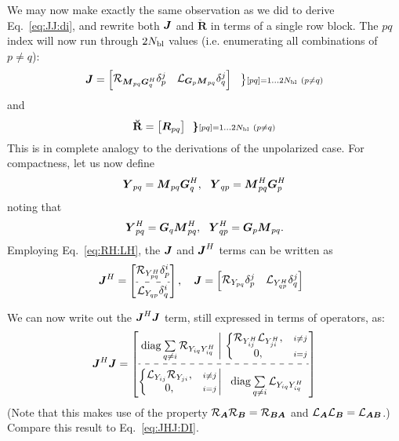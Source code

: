 \documentclass[useAMS,usenatbib]{mn2e}
\makeatletter
\newcommand{\mat}[1]{{\bmath{#1}}}
\newcommand{\JJ}{\mat{J}} %
\newcommand{\MM}{\mat{M}}
\newcommand{\GG}{\mat{G}}
\newcommand{\JHJ}{\JJ^H\JJ} %
\newcommand{\Matrix}[2]{\left [ \begin{array}{@{}#1@{}}#2\end{array} \right ]}
\newcommand{\AUGx}[1]{\mathbf{\breve{#1}}}
\newcommand{\RRr}{\AUGx{R}}
\newcommand{\Rop}[1]{\mathcal{R}_{{#1}}}
\newcommand{\Lop}[1]{\mathcal{L}_{{#1}}}
\numberwithin{equation}{section}
\makeatother
\begin{document}
We may now make exactly the same observation as we did to derive Eq.~\ref{eq:JJ:di}, and rewrite both $\JJ$ and $\RRr$ in terms of 
a single row block. The $pq$ index will now run through $2N_\mathrm{bl}$ values (i.e. enumerating all combinations of $p\ne q$):
\begin{equation}
\label{eq:JJ:pol}
\JJ = \Matrix{cc}{ 
\Rop{ \MM_{pq}\GG^H_q }\delta^j_p & 
\Lop{ \GG_p \MM_{pq}  }\delta^j_q \\
}~~ 
\bm{\big\}} \scriptstyle [pq]=1\dots 2\Nbl~(p\ne q)\\ 
\end{equation}
and 
\begin{equation}
\RRr = \Matrix{c}{ \mat{R}_{pq}}~~ 
\bm{\}} \scriptstyle [pq]=1\dots 2\Nbl~(p\ne q)\\ 
\end{equation}
This is in complete analogy to the derivations of the unpolarized case. For compactness, let us now define
\newcommand{\YY}{\mat{Y}}
\newcommand{\ZZ}{\mat{Z}}
\begin{equation}
\YY_{pq} = \MM_{pq} \GG^H_q,~~\YY_{qp} = \MM^H_{pq} \GG^H_p
\end{equation}
noting that 
\begin{equation}
\YY^H_{pq} = \GG_q \MM^H_{pq},~~\YY_{qp}^H = \GG_p \MM_{pq}.
\end{equation}
Employing Eq.~\ref{eq:RH:LH}, the $\JJ$ and $\JJ^H$ terms can be written as
\begin{equation}
\JJ^H = \Matrix{c}{
\Rop{ Y^H_{pq} }\delta^i_p \\[4pt]
\hdashline\\[-10pt]
\Lop{ Y_{qp}  }\delta^i_q \\
},~~~ 
\JJ = \Matrix{cc}{ 
\Rop{ Y_{pq} }\delta^j_p & 
\Lop{ Y^H_{qp}  }\delta^j_q \\
}~~ 
\end{equation}

We can now write out the $\JHJ$ term, still expressed in terms of operators, as:
\begin{equation}
\label{eq:JHJ:pol}
\JHJ = \JHJblocksFull{
  \mathrm{diag}\sum\limits_{q\ne i} \Rop{Y_{iq} Y^H_{iq}} 
}{
  \left \{ 
  \begin{array}{@{}cc@{}}
   \Rop{ Y^H_{ij}  } \Lop{Y^H_{ji}},&{\scriptstyle i\ne j} \\
   0, &{\scriptstyle i=j}
  \end{array} \right . 
}{
  \left \{ 
  \begin{array}{@{}cc@{}}
   \Lop{ Y_{ij}  } \Rop{ Y_{ji} },&{\scriptstyle i\ne j} \\
   0, &{\scriptstyle i=j}
  \end{array} \right . 
}{
  \mathrm{diag}\sum\limits_{q\ne i} \Lop{Y_{iq} Y^H_{iq}} 
}
\end{equation}
(Note that this makes use of the property $\Rop{\mat{A}}\Rop{\mat{B}}=\Rop{\mat{BA}}$ and 
$\Lop{\mat{A}}\Lop{\mat{B}}=\Lop{\mat{AB}}$.) Compare this result to Eq.~\ref{eq:JHJ:DI}.
\end{document}
